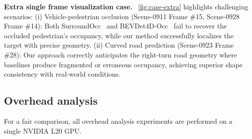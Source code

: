 \noindent\textbf{Extra single frame visualization case.} ~\cref{fig:case-extra} highlights challenging scenarios: 
(i) Vehicle-pedestrian occlusion (Scene-0911 Frame \#15, Scene-0928 Frame \#14): Both SurroundOcc~\cite{surroundOcc} and BEVDet4D-Occ~\cite{bevdet4d} fail to recover the occluded pedestrian’s occupancy, while our method successfully localizes the target with precise geometry.
(ii) Curved road prediction (Scene-0923 Frame \#28): Our approach correctly anticipates the right-turn road geometry where baselines produce fragmented or erroneous occupancy, achieving superior shape consistency with real-world conditions.




\subsection{Overhead analysis}

For a fair comparison, all overhead analysis experiments are performed on a single NVIDIA L20 GPU.

